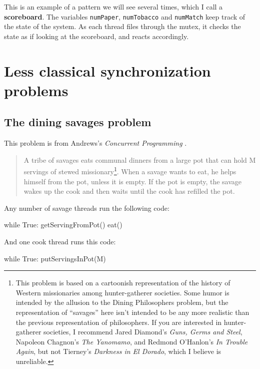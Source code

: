 \documentclass{book}
\begin{document}
This is an example of a pattern we will see several times, which
I call a {\bf scoreboard}.  The variables {\tt numPaper}, {\tt numTobacco}
and {\tt numMatch} keep track of the state of the system.  As each
thread files through the mutex, it checks the state as if looking
at the scoreboard, and reacts accordingly.



\chapter{Less classical synchronization problems}
\label{next}


\section{The dining savages problem}

This problem is from Andrews's
{\em Concurrent Programming} \cite{andrews}.

\begin {quotation}
A tribe of savages eats communal dinners from a large pot that can
hold M servings of stewed missionary\footnote{This problem is based on
a cartoonish representation of the history of Western missionaries
among hunter-gatherer societies.  Some humor is intended by the
allusion to the Dining Philosophers problem, but the representation of
``savages'' here isn't intended to be any more realistic than the
previous representation of philosophers.  If you are interested in
hunter-gatherer societies, I recommend Jared Diamond's {\em Guns,
Germs and Steel}, Napoleon Chagnon's {\em The Yanomamo}, and Redmond
O'Hanlon's {\em In Trouble Again}, but not Tierney's {\em Darkness in
El Dorado}, which I believe is unreliable.}.  When a savage wants to
eat, he helps himself from the pot, unless it is empty.  If the pot is
empty, the savage wakes up the cook and then waits until the cook has
refilled the pot.
\end{quotation}

Any number of savage threads run the following code:

\begin{unbreakable}[title={Unsynchronized savage code}]{}
while True:
    getServingFromPot()
    eat()
\end{unbreakable}

And one cook thread runs this code:

\pagebreak
\begin{unbreakable}[title={Unsynchronized cook code}]{}
while True:
    putServingsInPot(M)
\end{unbreakable}
\end{document}
